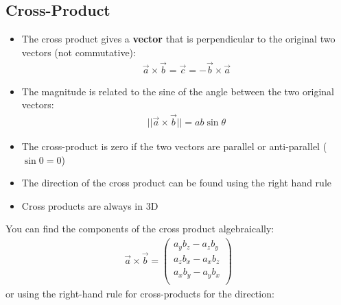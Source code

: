 \documentclass[aspectratio=169,
hyperref={colorlinks,urlcolor=blue}
]{beamer}
\begin{document}
\subsection{Cross-Product}
\label{subsec:crossproduct}
{
\scriptsize
\begin{itemize}
\item The cross product gives a \textbf{vector} that is perpendicular to the original two vectors (not commutative):
\begin{align*}
\vec a \times \vec b = \vec c = -\vec b \times \vec a
\end{align*}
\item The magnitude is related to the sine of the angle between the two original vectors:
\begin{align*}
||\vec a \times \vec b ||= ab\sin\theta
\end{align*}
\item The cross-product is zero if the two vectors are parallel or anti-parallel ($\sin 0 =0$)
\item The direction of the cross product can be found using the right hand rule
\item Cross products are always in 3D
\end{itemize}
}
{
\scriptsize
You can find the components of the cross product algebraically:
\begin{align*}
\vec a \times \vec b =\begin{pmatrix}
           a_yb_z - a_z b_y\\
           a_zb_x - a_x b_z\\
           a_xb_y - a_y b_x\\
         \end{pmatrix}
\end{align*}
or using the right-hand rule for cross-products for the direction:
}
\label{fig:math:righthandrule}
\end{document}
